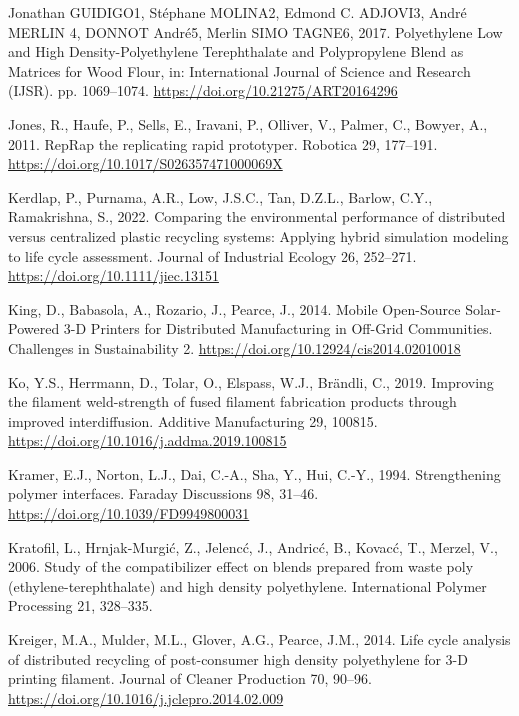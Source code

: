 \documentclass[
  12pt,
]{article}
\newlength{\cslhangindent}
\newlength{\cslentryspacingunit} %
\newenvironment{CSLReferences}[2] %
 {%
  \setlength{\parindent}{0pt}
  \ifodd #1
  \let\oldpar\par
  \def\par{\hangindent=\cslhangindent\oldpar}
  \fi
  \setlength{\parskip}{#2\cslentryspacingunit}
 }%
 {}
\begin{document}
\begin{CSLReferences}{1}{0}
\leavevmode{}%
Jonathan GUIDIGO1, Stéphane MOLINA2, Edmond C. ADJOVI3, André MERLIN 4,
DONNOT André5, Merlin SIMO TAGNE6, 2017. Polyethylene {Low} and {High
Density-Polyethylene Terephthalate} and {Polypropylene Blend} as
{Matrices} for {Wood Flour}, in: International {Journal} of {Science}
and {Research} ({IJSR}). pp. 1069--1074.
\url{https://doi.org/10.21275/ART20164296}

\leavevmode{}%
Jones, R., Haufe, P., Sells, E., Iravani, P., Olliver, V., Palmer, C.,
Bowyer, A., 2011. {RepRap} \textendash{} the replicating rapid
prototyper. Robotica 29, 177--191.
\url{https://doi.org/10.1017/S026357471000069X}

\leavevmode{}%
Kerdlap, P., Purnama, A.R., Low, J.S.C., Tan, D.Z.L., Barlow, C.Y.,
Ramakrishna, S., 2022. Comparing the environmental performance of
distributed versus centralized plastic recycling systems: {Applying}
hybrid simulation modeling to life cycle assessment. Journal of
Industrial Ecology 26, 252--271.
\url{https://doi.org/10.1111/jiec.13151}

\leavevmode{}%
King, D., Babasola, A., Rozario, J., Pearce, J., 2014. Mobile
{Open-Source Solar-Powered} 3-{D Printers} for {Distributed
Manufacturing} in {Off-Grid Communities}. Challenges in Sustainability
2. \url{https://doi.org/10.12924/cis2014.02010018}

\leavevmode{}%
Ko, Y.S., Herrmann, D., Tolar, O., Elspass, W.J., Brändli, C., 2019.
Improving the filament weld-strength of fused filament fabrication
products through improved interdiffusion. Additive Manufacturing 29,
100815. \url{https://doi.org/10.1016/j.addma.2019.100815}

\leavevmode{}%
Kramer, E.J., Norton, L.J., Dai, C.-A., Sha, Y., Hui, C.-Y., 1994.
Strengthening polymer interfaces. Faraday Discussions 98, 31--46.
\url{https://doi.org/10.1039/FD9949800031}

\leavevmode{}%
Kratofil, L., Hrnjak-Murgić, Z., Jelencć, J., Andricć, B., Kovacć, T.,
Merzel, V., 2006. Study of the compatibilizer effect on blends prepared
from waste poly (ethylene-terephthalate) and high density polyethylene.
International Polymer Processing 21, 328--335.

\leavevmode{}%
Kreiger, M.A., Mulder, M.L., Glover, A.G., Pearce, J.M., 2014. Life
cycle analysis of distributed recycling of post-consumer high density
polyethylene for 3-{D} printing filament. Journal of Cleaner Production
70, 90--96. \url{https://doi.org/10.1016/j.jclepro.2014.02.009}


\end{CSLReferences}
\end{document}
